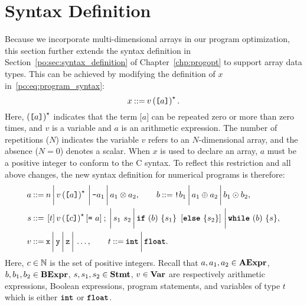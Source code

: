 \section{Syntax Definition}
\label{lo:sec:syntax_definition}

Because we incorporate multi-dimensional arrays in our program
optimization, this section further extends the syntax definition in
Section~\ref{po:sec:syntax_definition} of Chapter~\ref{chp:progopt} to support
array data types.  This can be achieved by modifying the definition of $x$
in~\eqref{po:eq:program_syntax}:
\begin{equation}
    x \mathbin{::=} v \left( \texttt{[$a$]} \right)^\star.
\end{equation}
Here, $\left( \texttt{[$a$]} \right)^\star$ indicates that the term $\texttt{[} a
\texttt{]}$ can be repeated zero or more than zero times, and $v$ is a variable
and $a$ is an arithmetic expression.  The number of repetitions ($N$) indicates
the variable $v$ refers to an $N$-dimensional array, and the absence ($N = 0$)
denotes a scalar.  When $x$ is used to declare an array, $a$ must be a positive
integer to conform to the C syntax.  To reflect this restriction and all above
changes, the new syntax definition for numerical programs is therefore:
\begin{equation}
    \begin{aligned}
        a \mathbin{::=} {} &
            n \,\bigg|\,
            v \left( \texttt{[$a$]} \right)^\star \,\bigg|\,
            \texttt{-}a_1 \,\bigg|\,
            a_1 \otimes a_2, \qquad
        b \mathbin{::=}
            \texttt{!}b_1 \,\bigg|\,
            a_1 \oplus a_2 \,\bigg|\,
            b_1 \odot b_2, \\
        s \mathbin{::=} {} &
            \left[ t \right] v \left( \texttt{[$c$]} \right)^\star
                \left[ \texttt{=}~a \right] \mathbin{;} \,\bigg|\,
            s_1~s_2 \,\bigg|\,
            \texttt{\textbf{if}}~(b)~\{ s_1 \}~\left[\texttt{\textbf{else}}~\{ s_2 \}\right] \,\bigg|\,
            \texttt{\textbf{while}}~(b)~\{s\}, \\
        v \mathbin{::=} {} & \texttt{x} \,\bigg|\, \texttt{y} \,\bigg|\, \texttt{z} \,\bigg|\, \mathellipsis,
            \qquad
        t \mathbin{::=} \texttt{\textbf{int}} \,\bigg|\, \texttt{\textbf{float}}.
    \end{aligned}
    \label{lo:eq:program_syntax}
\end{equation}
Here, $c \in \mathbb{N}$ is the set of positive integers.  Recall that
$a, a_1, a_2 \in \mathbf{AExpr}$, $b, b_1, b_2 \in \mathbf{BExpr}$, $s, s_1, s_2 \in
\mathbf{Stmt}$, $v \in \mathbf{Var}$ are respectively arithmetic expressions, Boolean
expressions, program statements, and variables of type $t$ which is either
$\texttt{\textbf{int}}$ or $\texttt{\textbf{float}}$.

